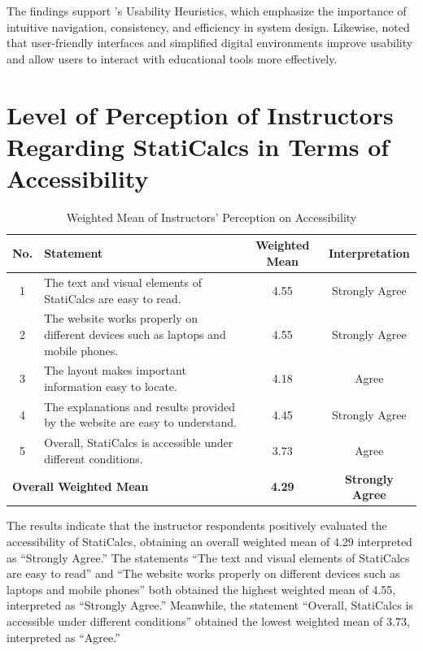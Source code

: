 The findings support \cite{nielsen_10_1994}’s Usability Heuristics, which emphasize the importance of intuitive navigation, consistency, and efficiency in system design. Likewise, \cite{hassan_usability_2022} noted that user-friendly interfaces and simplified digital environments improve usability and allow users to interact with educational tools more effectively.


\section{Level of Perception of Instructors Regarding StatiCalcs in Terms of Accessibility}

\begin{table}[H]
\centering
\caption{Weighted Mean of Instructors’ Perception on Accessibility}
\renewcommand{\arraystretch}{1.3}
\begin{tabular}{cp{6.5cm}cc}
\hline
\textbf{No.} & \textbf{Statement} & \textbf{Weighted Mean} & \textbf{Interpretation}\\
\hline
1 & The text and visual elements of StatiCalcs are easy to read. & 4.55 & Strongly Agree\\
2 & The website works properly on different devices such as laptops and mobile phones. & 4.55 & Strongly Agree\\
3 & The layout makes important information easy to locate. & 4.18 & Agree\\
4 & The explanations and results provided by the website are easy to understand. & 4.45 & Strongly Agree\\
5 & Overall, StatiCalcs is accessible under different conditions. & 3.73 & Agree\\
\multicolumn{2}{l}{\textbf{Overall Weighted Mean}} & \textbf{4.29} & \textbf{Strongly Agree}\\
\hline
\end{tabular}
\end{table}

The results indicate that the instructor respondents positively evaluated the accessibility of StatiCalcs, obtaining an overall weighted mean of 4.29 interpreted as ``Strongly Agree.'' The statements ``The text and visual elements of StatiCalcs are easy to read'' and ``The website works properly on different devices such as laptops and mobile phones'' both obtained the highest weighted mean of 4.55, interpreted as ``Strongly Agree.'' Meanwhile, the statement ``Overall, StatiCalcs is accessible under different conditions'' obtained the lowest weighted mean of 3.73, interpreted as ``Agree.''

